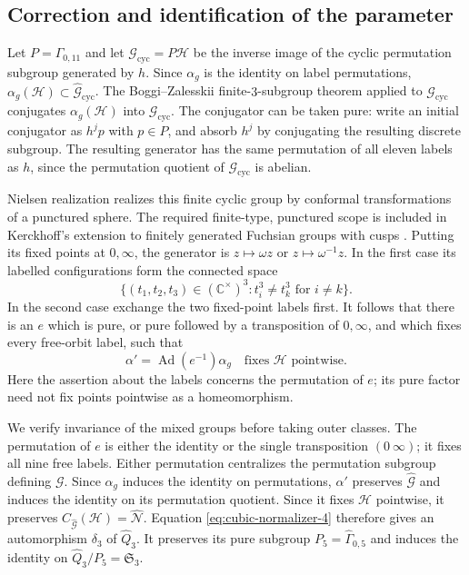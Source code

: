 \subsection{Correction and identification of the parameter}

Let $P=\Gamma_{0,11}$ and let
$\mathcal G_{\mathrm{cyc}}=P \mathcal H$ be the inverse image of the cyclic permutation
subgroup generated by $h$. Since $\alpha_g$ is the identity
on label permutations, $\alpha_g(\mathcal H)\subset\widehat{\mathcal G}_{\mathrm{cyc}}$.
The Boggi--Zalesskii finite-$3$-subgroup theorem
\cite[Theorem~A(i), p.~3; Theorem~6.2(i), p.~17]{CubicBZ}
applied to $\mathcal G_{\mathrm{cyc}}$ conjugates $\alpha_g(\mathcal H)$ into $\mathcal G_{\mathrm{cyc}}$.
The conjugator can be taken pure: write an initial conjugator
as $h^j p$ with $p\in\widehat P$, and absorb $h^j$ by
conjugating the resulting discrete subgroup. The resulting
generator has the same permutation of all eleven labels as
$h$, since the permutation quotient of $\mathcal G_{\mathrm{cyc}}$ is abelian.

Nielsen realization realizes this finite cyclic group by
conformal transformations of a punctured sphere. The required
finite-type, punctured scope is included in Kerckhoff's
extension to finitely generated Fuchsian groups with cusps
\cite[Section~4, pp.~255--256]{CubicKerckhoff}.
Putting its fixed points at $0,\infty$, the generator is
$z\mapsto\omega z$ or $z\mapsto\omega^{-1}z$.
In the first case its labelled configurations form the
connected space
\[
 \{(t_1,t_2,t_3)\in(\mathbb C^\times)^3:
                         t_i^3\ne t_k^3\text{ for }i\ne k\}.
\]
In the second case exchange the two fixed-point labels first.
It follows that there is an $e$ which is pure, or pure
followed by a transposition of $0,\infty$, and which fixes
every free-orbit label, such that
\begin{equation}\label{eq:cubic-normalizer-5}
\alpha'=\operatorname{Ad}(e^{-1})\alpha_g
       \quad\text{fixes }\mathcal H\text{ pointwise}.
\end{equation}
Here the assertion about the labels concerns the permutation
of $e$; its pure factor need not fix points pointwise as a
homeomorphism.

We verify invariance of the mixed groups before taking
outer classes. The permutation of $e$ is either the identity
or the single transposition $(0\ \infty)$; it fixes all nine
free labels. Either permutation centralizes the permutation
subgroup defining $\mathcal G$. Since $\alpha_g$ induces the identity
on permutations, $\alpha'$ preserves $\widehat{\mathcal G}$ and
induces the identity on its permutation quotient. Since it
fixes $\mathcal H$ pointwise, it preserves
$C_{\widehat{\mathcal G}}(\mathcal H)=\widehat{\mathcal N}$. Equation \eqref{eq:cubic-normalizer-4} therefore
gives an automorphism $\delta_3$ of $\widehat Q_3$.
It preserves its pure subgroup
$P_5=\widehat\Gamma_{0,5}$ and induces the identity on
$\widehat Q_3/P_5=\mathfrak S_3$.

